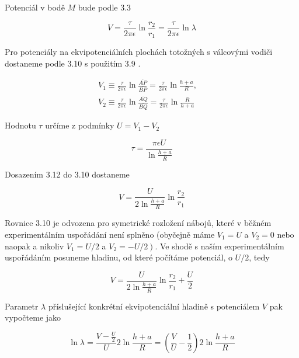 \documentclass[czech,11pt,a4paper]{article}
\begin{document}
\begin{multicols}{2}
	
	Potenciál v bodě $M$ bude podle 3.3
	
	
	\begin{equation*}
		V=\frac{\tau}{2 \pi \epsilon} \ln \frac{r_{2}}{r_{1}}=\frac{\tau}{2 \pi \epsilon} \ln \lambda \tag{3.10}
	\end{equation*}
	
	
	Pro potenciály na ekvipotenciálních plochách totožných s válcovými vodiči dostaneme podle 3.10 s použitím 3.9 .
	
	
	\begin{gather*}
		V_{1} \equiv \frac{\tau}{2 \pi \epsilon} \ln \frac{\overline{A P}}{\overline{B P}}=\frac{\tau}{2 \pi \epsilon} \ln \frac{h+a}{R}, \quad \\ V_{2} \equiv \frac{\tau}{2 \pi \epsilon} \ln \frac{\overline{A Q}}{\overline{B Q}}=\frac{\tau}{2 \pi \epsilon} \ln \frac{R}{h+a} \tag{3.11}
	\end{gather*}
	
	
	Hodnotu $\tau$ určíme z podmínky $U=V_{1}-V_{2}$
	
	
	\begin{equation*}
		\tau=\frac{\pi \epsilon U}{\ln \frac{h+a}{R}} \tag{3.12}
	\end{equation*}
	
	
	Dosazením 3.12 do 3.10 dostaneme
	
	
	\begin{equation*}
		V=\frac{U}{2 \ln \frac{h+a}{R}} \ln \frac{r_{2}}{r_{1}} \tag{3.13}
	\end{equation*}
	
	
	Rovnice 3.10 je odvozena pro symetrické rozložení nábojů, které v běžném experimentálním uspořádání není splněno (obyčejně máme $V_{1}=U$ a $V_{2}=0$ nebo naopak a nikoliv $V_{1}=U / 2$ a $\left.V_{2}=-U / 2\right)$. Ve shodě s naším experimentálním uspořádáním posuneme hladinu, od které počítáme potenciál, o $U / 2$, tedy
	
	
	\begin{equation*}
		V=\frac{U}{2 \ln \frac{h+a}{R}} \ln \frac{r_{2}}{r_{1}}+\frac{U}{2} \tag{3.14}
	\end{equation*}
	
	
	Parametr $\lambda$ příslušející konkrétní ekvipotenciální hladině s potenciálem $V$ pak vypočteme jako
	
	
	\begin{equation*}
		\ln \lambda=\frac{V-\frac{U}{2}}{U} 2 \ln \frac{h+a}{R}=\left(\frac{V}{U}-\frac{1}{2}\right) 2 \ln \frac{h+a}{R} \tag{3.15}
	\end{equation*}
	

\end{multicols}
\end{document}
